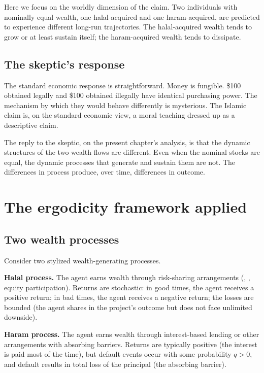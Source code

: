 Here we focus on the worldly dimension of the claim. Two
individuals with nominally equal wealth, one halal-acquired and
one haram-acquired, are predicted to experience different long-run
trajectories. The halal-acquired wealth tends to grow or at least
sustain itself; the haram-acquired wealth tends to dissipate.

\subsection{The skeptic's response}

The standard economic response is straightforward. Money is
fungible. \$100 obtained legally and \$100 obtained illegally have
identical purchasing power. The mechanism by which they would
behave differently is mysterious. The Islamic claim is, on the
standard economic view, a moral teaching dressed up as a
descriptive claim.

The reply to the skeptic, on the present chapter's analysis, is
that the dynamic structures of the two wealth flows are different.
Even when the nominal stocks are equal, the dynamic processes that
generate and sustain them are not. The differences in process
produce, over time, differences in outcome.

\section{The ergodicity framework applied}
\label{sec:halal-ergodicity}

\subsection{Two wealth processes}

Consider two stylized wealth-generating processes.

\textbf{Halal process.} The agent earns wealth through risk-sharing
arrangements (, , equity participation).
Returns are stochastic: in good times, the agent receives a positive
return; in bad times, the agent receives a negative return; the
losses are bounded (the agent shares in the project's outcome but
does not face unlimited downside).

\textbf{Haram process.} The agent earns wealth through interest-based
lending or other arrangements with absorbing barriers. Returns are
typically positive (the interest is paid most of the time), but
default events occur with some probability $q > 0$, and default
results in total loss of the principal (the absorbing barrier).

